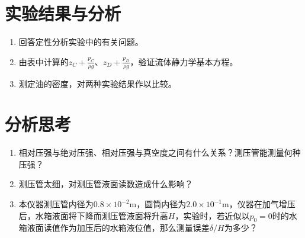 \documentclass[UTF8,AutoFakeBold,a4paper]{article}  %
\begin{document}
    \section{实验结果与分析}
    \begin{enumerate}[label=(\arabic*)]
        \item 回答定性分析实验中的有关问题。
        \item 由表中计算的$\displaystyle z_{C}+\frac{p_{C}}{\rho g} $、$\displaystyle z_{D}+\frac{p_{D}}{\rho g} $，验证流体静力学基本方程。
        \item 测定油的密度，对两种实验结果作以比较。
    \end{enumerate}
    \section{分析思考}
    \begin{enumerate}
        \item 相对压强与绝对压强、相对压强与真空度之间有什么关系？测压管能测量何种压强？
        \item 测压管太细，对测压管液面读数造成什么影响？
        \item 本仪器测压管内径为$ 0.8\times10^{-2} \mathrm{m} $，圆筒内径为$ 2.0\times10^{-1} \mathrm{m} $，仪器在加气增压后，水箱液面将下降而测压管液面将升高$ H $，实验时，若近似以$ p_{0} = 0 $时的水箱液面读值作为加压后的水箱液位值，那么测量误差$ \delta/H $为多少？
    \end{enumerate}
\end{document}
